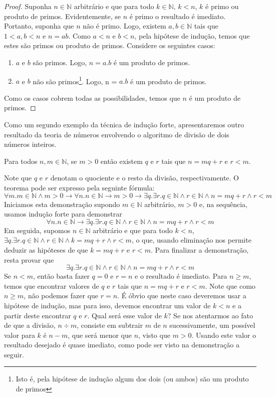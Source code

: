\begin{proof}
Suponha $n\in\mathbb{N}$ arbitrário e que para todo $k \in
\mathbb{N},\,k < n$, $k$ é primo ou produto de primos. Evidentemente,
se $n$ é primo o resultado é imediato. Portanto, suponha que $n$ não é
primo. Logo, existem $a,b\in\mathbb{N}$ tais que $1 < a,b < n$ e $n =
ab$. Como $a < n$ e $b < n$, pela hipótese de indução, temos que estes
são primos ou produto de primos. Considere os seguintes casos:
\begin{enumerate}
  \item $a$ e $b$ são primos. Logo, $n = a.b$ é um produto de primos.
  \item $a$ e $b$ não são primos\footnote{Isto é, pela hipótese de
      indução algum dos dois (ou ambos) são um produto de
      primos}. Logo, n = $a.b$ é um produto de primos.
\end{enumerate}
Como os casos cobrem todas as possibilidades, temos que $n$ é um
produto de primos.
\end{proof}
Como um segundo exemplo da técnica de indução forte, apresentaremos
outro resultado da teoria de números envolvendo o algoritmo de
divisão de dois números inteiros.
\begin{Theorem}
Para todos $n,m\in\mathbb{N}$, se $m > 0$ então existem $q$ e
$r$ tais que $n = mq + r$ e $r < m$.
\end{Theorem}
Note que $q$ e $r$ denotam o quociente e o resto da divisão,
respectivamente. O teorema pode ser expresso pela seguinte fórmula:
\[
\forall m. m\in\mathbb{N} \land m > 0\to \forall n. n \in\mathbb{N} \to m > 0
\to \exists q. \exists r. q \in\mathbb{N}\land r \in \mathbb{N} \land
n = m q + r \land r < m
\]
Iniciamos esta demonstração supondo $m \in \mathbb{N}$ arbitrário, $m
> 0$ e, na sequência, usamos indução forte para demonstrar
\[
\forall n. n \in\mathbb{N}
\to \exists q. \exists r. q \in\mathbb{N}\land r \in \mathbb{N} \land
n = m q + r \land r < m
\]
Em seguida, supomos $n \in\mathbb{N}$ arbitrário e que para todo $k < n$,
$\exists q. \exists r. q \in\mathbb{N}\land r \in \mathbb{N} \land
k = m q + r \land r < m$, o que, usando eliminação nos permite deduzir
as hipóteses de que $k = m q + r$ e $r < m$. Para finalizar a
demonstração, resta provar que
\[
\exists q. \exists r. q \in\mathbb{N}\land r \in \mathbb{N} \land
n = m q + r \land r < m
\]
Se $n < m$, então basta fazer $q = 0$ e $r = n$ e o resultado é
imediato. Para $n \geq m$, temos que encontrar valores de $q$ e $r$
tais que $n = mq + r$ e $r < m$. Note que como $n \geq m$, não podemos fazer que $r =
n$. É óbvio que neste caso deveremos usar a hipótese de indução, mas
para isso, devemos encontrar um valor de $k< n$ e  a partir deste
encontrar $q$ e $r$. Qual será esse valor de $k$? Se nos atentarmos ao
fato de que a divisão, $n \div m$, consiste em subtrair $m$ de $n$
sucessivamente, um possível valor para $k$ é $n - m$, que será menor
que $n$, visto que $m > 0$. Usando este valor o resultado desejado é
quase imediato, como pode ser visto na demonstração a seguir.

